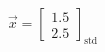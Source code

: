 \documentclass[preview]{standalone}
\begin{document}
\begin{align*}
\vec{x}=\begin{bmatrix}1.5\\2.5\end{bmatrix}_{\mathrm{std}}
\end{align*}
\end{document}
